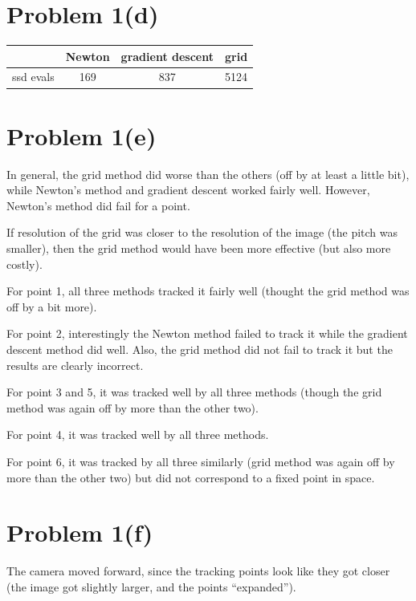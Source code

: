 \documentclass{article}
\begin{document}
\section*{Problem 1(d)}


\begin{center}
\begin{tabular}{ ||c||c|c|c|| } 
	\hline
				& Newton & gradient descent & grid \\ \hline
	ssd evals 	& 169 & 837 & 5124\\

\hline
\end{tabular}
\end{center}

\section*{Problem 1(e)}

In general, the grid method did worse than the others (off by at least a little bit), while Newton's method and gradient descent worked fairly well. However, Newton's method did fail for a point.

If resolution of the grid was closer to the resolution of the image (the pitch was smaller), then the grid method would have been more effective (but also more costly).

For point 1, all three methods tracked it fairly well (thought the grid method was off by a bit more).

For point 2, interestingly the Newton method failed to track it while the gradient descent method did well. Also, the grid method did not fail to track it but the results are clearly incorrect.

For point 3 and 5, it was tracked well by all three methods (though the grid method was again off by more than the other two).

For point 4, it was tracked well by all three methods.

For point 6, it was tracked by all three similarly (grid method was again off by more than the other two) but did not correspond to a fixed point in space.


\section*{Problem 1(f)}

The camera moved forward, since the tracking points look like they got closer (the image got slightly larger, and the points ``expanded'').
\end{document}
